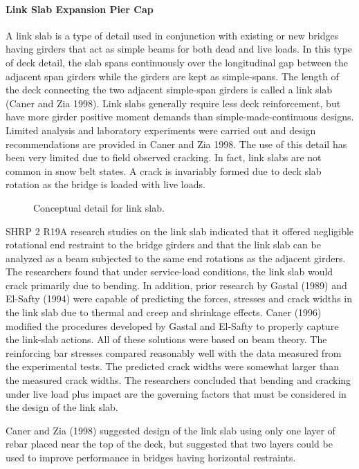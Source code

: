 \paragraph{Link Slab Expansion Pier Cap}
A link slab is a type of detail used in conjunction with existing or new bridges having girders that act as simple
beams for both dead and live loads. In this type of deck detail, the slab spans continuously over the longitudinal gap
between the adjacent span girders while the girders are kept as simple-spans. The length of the deck connecting the
two adjacent simple-span girders is called a link slab (Caner and Zia 1998). Link slabs generally require less deck reinforcement, but have more girder positive moment demands than simple-made-continuous designs. Limited
analysis and laboratory experiments were carried out and design recommendations are provided in Caner and Zia
1998. The use of this detail has been very limited due to field observed cracking. In fact, link slabs are not common in
snow belt states. A crack is invariably formed due to deck slab rotation as the bridge is loaded with live loads.

\begin{figure}
  \caption{Conceptual detail for link slab.}
  \label{fig:conceptual-detail-link-slab}
\end{figure}

SHRP 2 R19A research studies on the link slab indicated that it offered negligible rotational end restraint to the
bridge girders and that the link slab can be analyzed as a beam subjected to the same end rotations as the adjacent
girders. The researchers found that under service-load conditions, the link slab would crack primarily due to bending.
In addition, prior research by Gastal (1989) and El-Safty (1994) were capable of predicting the forces, stresses and
crack widths in the link slab due to thermal and creep and shrinkage effects. Caner (1996) modified the procedures
developed by Gastal and El-Safty to properly capture the link-slab actions. All of these solutions were based on beam
theory. The reinforcing bar stresses compared reasonably well with the data measured from the experimental tests.
The predicted crack widths were somewhat larger than the measured crack widths. The researchers concluded that
bending and cracking under live load plus impact are the governing factors that must be considered in the design of
the link slab.

Caner and Zia (1998) suggested design of the link slab using only one layer of rebar placed near the top of the
deck, but suggested that two layers could be used to improve performance in bridges having horizontal restraints.

